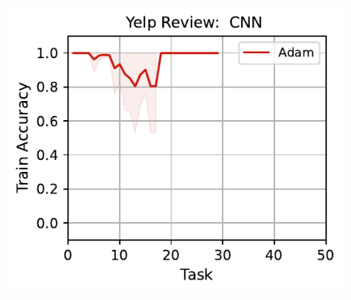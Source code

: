 \begin{figure}[htb!]
{        \includegraphics[width=\textwidth]{figs/Accuracy/nlp/cnn/yelp_review_full_50.pdf}
    }
    \\
\end{figure}
